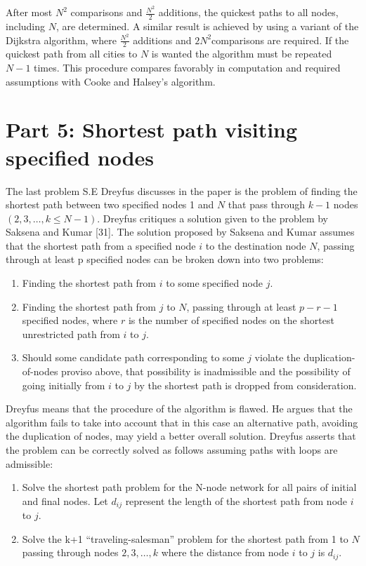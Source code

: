 \documentclass{article}
\begin{document}
\noindent After most $N^{2}$ comparisons and $\frac{N^{2}}{2}$ additions, 
the quickest paths to all nodes, including $N$, are determined. A similar 
result is achieved by using a variant of the Dijkstra algorithm, where $\frac{N^{2}}{2}$
additions and $2N^{2}$comparisons are required. If the quickest path from all 
cities to $N$ is wanted the algorithm must be repeated $N-1$ times. This 
procedure compares favorably in computation and required assumptions with 
Cooke and Halsey's algorithm.

\newpage

\section{Part 5: Shortest path visiting specified nodes}
The last problem S.E Dreyfus discusses in the paper is the problem of
finding the shortest path between two specified nodes 1 and $N$ that pass
through $k-1$ nodes $(2,3,\dots,k \leq N-1)$. Dreyfus critiques a solution given to 
the problem by Saksena and Kumar [31]. The solution proposed by Saksena and 
Kumar assumes that the shortest path from a specified node $i$ to the destination 
node $N$, passing through at least p specified nodes can be broken down into two problems:
\begin{enumerate}
    \item Finding the shortest path from $i$ to some specified node $j$.
    \item Finding the shortest path from $j$ to $N$, passing through at 
    least $p-r-1$ specified nodes, where $r$ is the number of 
    specified nodes on the shortest unrestricted path from $i$ to $j$.
    \item Should some candidate path corresponding to some $j$ violate the 
    duplication-of-nodes proviso above, that possibility is inadmissible 
    and the possibility of going initially from $i$ to $j$ by the shortest path
    is dropped from consideration.
\end{enumerate}

\noindent Dreyfus means that the procedure of the algorithm is flawed. He argues 
that the algorithm fails to take into account that in this case an alternative path, 
avoiding the duplication of nodes, may yield a better overall solution. 
Dreyfus asserts that the problem can be correctly solved as follows assuming 
paths with loops are admissible: 

\begin{enumerate}
    \item Solve the shortest path problem for the N-node network for all pairs of
    initial and final nodes. Let $d_{ij}$ represent the length of the shortest path 
    from node $i$ to $j$.
    \item Solve the k+1 “traveling-salesman” problem for the shortest path from 
    1 to $N$ passing through nodes $2, 3, \dots,k$ where the distance from node 
    $i$ to $j$ is $d_{ij}$. 
\end{enumerate}
\end{document}
